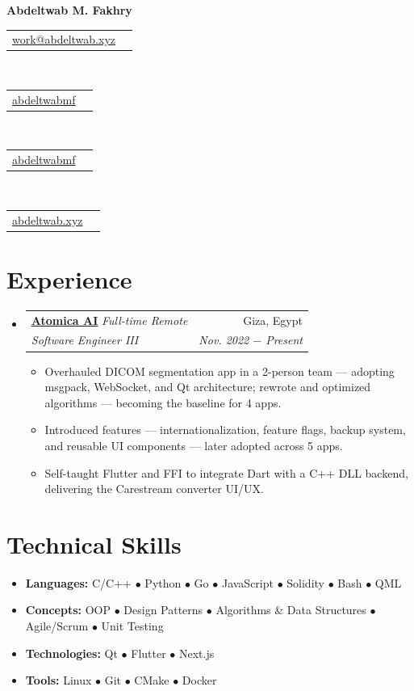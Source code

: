 \documentclass[letterpaper, 11pt]{article}
\makeatletter
\newcommand{\experience}[7] {
	\vspace{-1pt}\item[]
  \begin{tabular*}{1\textwidth}[t]{l@{\extracolsep{\fill}}r}
		#1 \href{#2}{\textbf{\color{RoyalBlue}#3}}
		\textbar{} \textit{\footnotesize#4} & #5 \\
		\textit{\small #6} & \textit{\small #7} \\
  \end{tabular*}
  \vspace{-8pt}
}
\newcommand{\subexperience}[1] {
\item\small
  {#1}
  \vspace{-2pt}
}
\newcommand{\technicalskill}[3] {
  \vspace{-1pt}
	\item[]\small
  #1 \textbf{#2: }{\footnotesize{#3}}
  \vspace{-2pt}
}
\newcommand{\contact}[4] {
  \begin{tabular}{lr}
    {\href{#1}{\color{#3} #2 #4}}
  \end{tabular}
  \vspace{-4pt}
}
\newcommand{\bulletitem}[1] {{\tiny$\bullet$} #1}
\makeatother
\begin{document}
\begin{center}
\textbf{\Huge{Abdeltwab M. Fakhry}}
\vspace{-4pt}
\end{center}

\begin{center}
  \small
  \contact
  {mailto:work@abdeltwab.xyz}
  {\faIcon{envelope}}{RoyalBlue}{work@abdeltwab.xyz}\,
  \contact
  {https://www.linkedin.com/in/abdeltwabmf}
  {\faIcon{linkedin}}{RoyalBlue}{abdeltwabmf}\,
  \contact
  {https://github.com/AbdeltwabMF}
  {\faIcon{github}}{RoyalBlue}{abdeltwabmf}\,
  \contact
  {https://abdeltwab.xyz}
  {\faIcon{globe}}{RoyalBlue}{abdeltwab.xyz}
\end{center}\vspace{8pt}

\section{Experience}
\begin{itemize}[leftmargin=0pt]
  \experience
	{\faIcon{briefcase}}
	{https://atomica.ai/}{Atomica AI}{Full-time \textbar{} Remote}{Giza, Egypt}
  {Software Engineer III}{Nov. 2022 $-$ Present}

  \begin{itemize}
    \subexperience
		{Overhauled DICOM segmentation app in a 2-person team — adopting msgpack, WebSocket, and Qt architecture; rewrote and optimized algorithms — becoming the baseline for 4 apps.}
    \subexperience
		{Introduced features — internationalization, feature flags, backup system, and reusable UI components — later adopted across 5 apps.}
    \subexperience
		{Self-taught Flutter and FFI to integrate Dart with a C++ DLL backend, delivering the Carestream converter UI/UX.}
  \end{itemize}\vspace{-4pt}
\end{itemize}

\section{Technical Skills}
\begin{itemize}[leftmargin=0pt]
  \technicalskill
  {}{Languages}
	{C/C++ \bulletitem{Python} \bulletitem{Go} \bulletitem{JavaScript} \bulletitem{Solidity} \bulletitem{Bash} \bulletitem{QML}}

  \technicalskill
  {}{Concepts}
	{OOP \bulletitem{Design Patterns} \bulletitem{Algorithms \& Data Structures} \bulletitem{Agile/Scrum} \bulletitem{Unit Testing}}

  \technicalskill
  {}{Technologies}
	{Qt \bulletitem{Flutter} \bulletitem{Next.js}}

  \technicalskill
  {}{Tools}
  {Linux \bulletitem{Git} \bulletitem{CMake} \bulletitem{Docker}}
\end{itemize}
\end{document}
